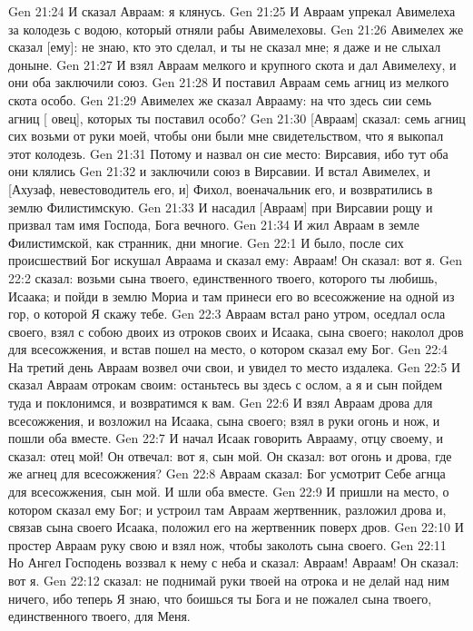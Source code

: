 \vs Gen 21:24 И сказал Авраам: я клянусь.
\vs Gen 21:25 И Авраам упрекал Авимелеха за колодезь с водою, который отняли рабы Авимелеховы.
\vs Gen 21:26 Авимелех же сказал [ему]: не знаю, кто это сделал, и ты не сказал мне; я даже и не слыхал  доныне.
\vs Gen 21:27 И взял Авраам мелкого и крупного скота и дал Авимелеху, и они оба заключили союз.
\vs Gen 21:28 И поставил Авраам семь агниц из  мелкого скота особо.
\vs Gen 21:29 Авимелех же сказал Аврааму: на что здесь сии семь агниц [ овец], которых ты поставил особо?
\vs Gen 21:30 [Авраам] сказал: семь агниц сих возьми от руки моей, чтобы они были мне свидетельством, что я выкопал этот колодезь.
\vs Gen 21:31 Потому и назвал он сие место: Вирсавия, ибо тут оба они клялись
\vs Gen 21:32 и заключили союз в Вирсавии. И встал Авимелех, и [Ахузаф, невестоводитель его, и] Фихол, военачальник его, и возвратились в землю Филистимскую.
\vs Gen 21:33 И насадил [Авраам] при Вирсавии рощу и призвал там имя Господа, Бога вечного.
\vs Gen 21:34 И жил Авраам в земле Филистимской, как странник, дни многие.
\vs Gen 22:1 И было, после сих происшествий Бог искушал Авраама и сказал ему: Авраам! Он сказал: вот я.
\vs Gen 22:2  сказал: возьми сына твоего, единственного твоего, которого ты любишь, Исаака; и пойди в землю Мориа и там принеси его во всесожжение на одной из гор, о которой Я скажу тебе.
\vs Gen 22:3 Авраам встал рано утром, оседлал осла своего, взял с собою двоих из отроков своих и Исаака, сына своего; наколол дров для всесожжения, и встав пошел на место, о котором сказал ему Бог.
\vs Gen 22:4 На третий день Авраам возвел очи свои, и увидел то место издалека.
\vs Gen 22:5 И сказал Авраам отрокам своим: останьтесь вы здесь с ослом, а я и сын пойдем туда и поклонимся, и возвратимся к вам.
\vs Gen 22:6 И взял Авраам дрова для всесожжения, и возложил на Исаака, сына своего; взял в руки огонь и нож, и пошли оба вместе.
\vs Gen 22:7 И начал Исаак говорить Аврааму, отцу своему, и сказал: отец мой! Он отвечал: вот я, сын мой. Он сказал: вот огонь и дрова, где же агнец для всесожжения?
\vs Gen 22:8 Авраам сказал: Бог усмотрит Себе агнца для всесожжения, сын мой. И шли  оба вместе.
\rsbpar\vs Gen 22:9 И пришли на место, о котором сказал ему Бог; и устроил там Авраам жертвенник, разложил дрова и, связав сына своего Исаака, положил его на жертвенник поверх дров.
\vs Gen 22:10 И простер Авраам руку свою и взял нож, чтобы заколоть сына своего.
\vs Gen 22:11 Но Ангел Господень воззвал к нему с неба и сказал: Авраам! Авраам! Он сказал: вот я.
\vs Gen 22:12  сказал: не поднимай руки твоей на отрока и не делай над ним ничего, ибо теперь Я знаю, что боишься ты Бога и не пожалел сына твоего, единственного твоего, для Меня.
